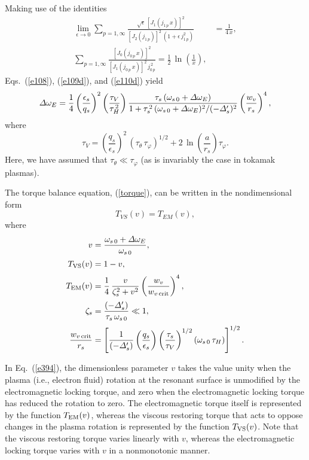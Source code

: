 \documentclass[12pt,prb,aps]{revtex4-1}
\begin{document}
Making use of the identities 
\begin{align}\label{e417a}
\lim_{\epsilon\rightarrow 0}\sum_{p=1,\infty} \frac{\sqrt{\epsilon}\,[J_1(j_{1\,p}\,x)]^{2}}{[J_2(j_{1\,p})]^2\,(1+\epsilon\,j_{1\,p}^2)}
&=\frac{1}{4\,x},\\[0.5ex]
\sum_{p=1,\infty} \frac{[J_0(j_{0\,p}\,x)]^2}{[J_1(j_{0\,p}\,x)]^2\,j_{0\,p}^{\,2}} =\frac{1}{2}\,\ln\!\left(\frac{1}{x}\right),\label{e418a}
\end{align}
Eqs.~(\ref{e108}), (\ref{e109d}), and (\ref{e110d}) yield
\begin{equation}\label{torque}
{\mit\Delta}\omega_E = \frac{1}{4}\left(\frac{\epsilon_s}{q_s}\right)^2\left(\frac{\tau_V}{\tau_H^{\,2}}\right)\frac{\tau_s\,(\omega_{s\,0}+{\mit\Delta}\omega_E)}{1+\tau_s^{\,2}\,(\omega_{s\,0}+{\mit\Delta}\omega_E)^2/(-{\mit\Delta}_s')^2}\left(\frac{w_v}{r_s}\right)^4,
\end{equation}
where
\begin{equation}
\tau_V = \left(\frac{q_s}{\epsilon_s}\right)^2\,(\tau_\theta\,\tau_\varphi)^{1/2} + 2\,\ln\!\left(\frac{a}{r_s}\right)\tau_\varphi.
\end{equation}
Here, we have assumed that $\tau_\theta\ll \tau_\varphi$ (as is invariably the case in tokamak plasmas). 

The torque balance equation, (\ref{torque}), can be written in the nondimensional form 
\begin{equation}\label{e394}
T_{VS}(v)= T_{EM}(v),
\end{equation}
where
\begin{align}
v&=\frac{\omega_{s\,0}+{\mit\Delta}\omega_E}{\omega_{s\,0}},\\[0.5ex]
T_{\rm VS}(v) &= 1- v,\\[0.5ex]
T_{\rm EM}(v) &= \frac{1}{4}\,\frac{v}{\zeta_s^{2}+v^2}
\left(\frac{w_v}{w_{v\,{\rm crit}}}\right)^4,\\[0.5ex]
\zeta_s &= \frac{(-{\mit\Delta}'_s)}{\tau_s\,\omega_{s\,0}}\ll 1,\\[0.5ex]
\frac{w_{v\,{\rm crit}}}{r_s}&= \left[\frac{1}{(-{\mit\Delta}'_s)}\left(\frac{q_s}{\epsilon_s}\right)\left(\frac{\tau_s}{\tau_V}\right)^{1/2}(\omega_{s\,0}\,\tau_H)\right]^{1/2}.
\end{align}

In Eq.~(\ref{e394}), the dimensionless
parameter $v$ takes the value unity when the plasma (i.e., electron fluid) rotation at the resonant surface is unmodified by
the electromagnetic locking torque, and zero when the electromagnetic locking torque has reduced the rotation to zero. The electromagnetic torque itself
is represented  by the function $T_{\rm EM}(v)$, whereas the viscous restoring torque that acts to oppose changes in the plasma rotation is represented
by the function $T_{\rm VS}(v)$. Note that the viscous restoring torque varies linearly with $v$,
whereas the electromagnetic locking torque varies with $v$ in a nonmonotonic manner.
\end{document}
